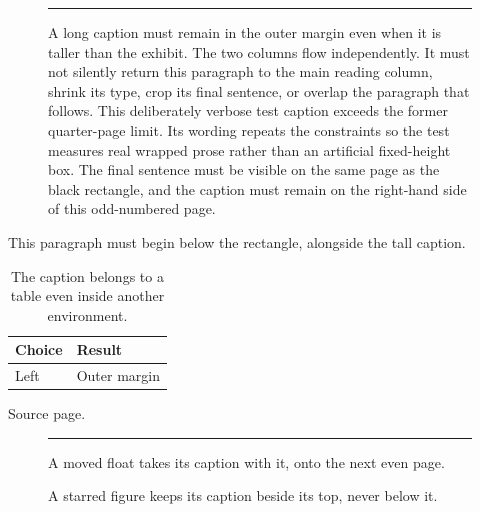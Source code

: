 \begin{figure}[htbp]
\centering
\rule{180pt}{45pt}
\caption[Long caption test]{A long caption must remain in the outer margin
even when it is taller than the exhibit. The two columns flow independently.
It must not silently return this paragraph to the main reading
column, shrink its type, crop its final sentence, or overlap the paragraph that
follows. This deliberately verbose test caption exceeds the former quarter-page
limit. Its wording repeats the constraints so the test measures real wrapped
prose rather than an artificial fixed-height box. The final sentence must be
visible on the same page as the black rectangle, and the caption must remain
on the right-hand side of this odd-numbered page.}
\label{fixture:long}
\end{figure}
This paragraph must begin below the rectangle, alongside the tall caption.
\clearpage
\begin{table}[htbp]
\begin{center}
\caption{The caption belongs to a table even inside another environment.}
\label{fixture:nested-table}
\begin{tabular}{ll}
\toprule Choice & Result\\\midrule Left & Outer margin\\\bottomrule
\end{tabular}
\end{center}
\end{table}
\clearpage
\noindent Source page.\par\vspace*{400pt}
\begin{figure}[t]
\centering\rule{180pt}{220pt}
\caption{A moved float takes its caption with it, onto the next even page.}
\label{fixture:moved}
\end{figure}
\clearpage
\begin{figure}[htbp]
\centering
{}
\caption{A starred figure keeps its caption beside its top, never below it.}
\label{fixture:wide}
\end{figure}
